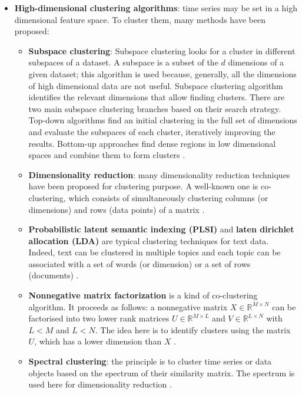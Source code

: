 \begin{itemize}
\item  \textbf{High-dimensional clustering algorithms}: time series may be set in a high dimensional feature space. To cluster them, many methods have been proposed:

\begin{itemize}
	\item  \textbf{Subspace clustering}: Subspace clustering looks for a cluster in 	different subspaces of a dataset.  A subspace is a subset of the $d$ dimensions 		of a given dataset; this algorithm is used because, generally, all the dimensions of high dimensional data are not useful. 	Subspace clustering algorithm identifies the relevant dimensions that allow 		finding clusters. There are two main subspace clustering branches based on their 		search strategy. Top-down algorithms find an initial clustering in the full set 		of dimensions and evaluate the subspaces of each cluster, iteratively improving 	the results. Bottom-up approaches find dense regions in low dimensional spaces 		and combine them to form clusters \cite{parsons2004subspace}.
	\item \textbf{Dimensionality reduction}: many dimensionality reduction 				techniques have been proposed for clustering purpose. A well-known one is co-clustering, which consists of simultaneously clustering  columns (or dimensions) 	and	rows (data points) of a matrix \cite{dhillon2003information}.
	\item \textbf{Probabilistic latent semantic indexing (PLSI)} and \textbf{laten 		dirichlet allocation (LDA)}  are typical clustering techniques for text data. Indeed, text can be clustered in multiple topics and  each topic can be associated with a 		set of words (or dimension) or a set of rows (documents) \cite{hofmann2017probabilistic}.
	\item \textbf{Nonnegative matrix factorization} is a kind of co-clustering 			algorithm. It proceeds as follows: a nonnegative matrix $X \in \mathbb{R}^{M			\times N}$ can be 			factorised into two lower rank matrices $U \in 			\mathbb{R}^{M\times L}$ and $V \in \mathbb{R}^{L\times N}$ with $L < M$ and $L 		< N$.  The idea here is to identify clusters using the matrix $U$, which has a lower 	dimension than $X$  						\cite{wang2013nonnegative}.
	\item \textbf{Spectral clustering}: the principle is to cluster time series or 		data objects based on the spectrum of their similarity matrix. The spectrum 			is used here for dimensionality reduction  \cite{filippone2008survey}.
	
\end{itemize}
 

\end{itemize}
